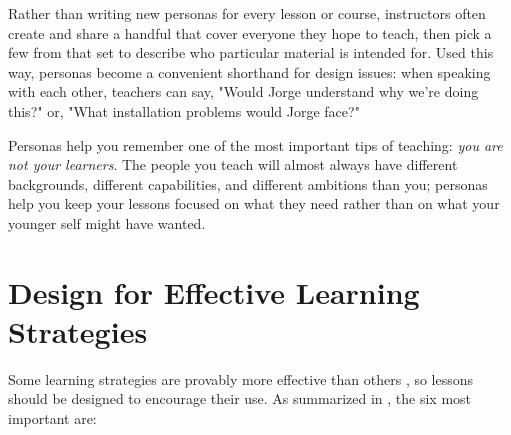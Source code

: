 \documentclass[10pt,letterpaper]{article}
\newcommand{\rulemajor}[1]{\section{#1}}
\begin{document}
Rather than writing new personas for every lesson or course, instructors often
create and share a handful that cover everyone they hope to teach, then pick a
few from that set to describe who particular material is intended for.  Used
this way, personas become a convenient shorthand for design issues: when
speaking with each other, teachers can say, "Would Jorge understand why we're
doing this?" or, "What installation problems would Jorge face?"

Personas help you remember one of the most important tips of teaching:
\emph{you are not your learners}.  The people you teach will almost always have
different backgrounds, different capabilities, and different ambitions than you;
personas help you keep your lessons focused on what they need rather than on
what your younger self might have wanted.

\rulemajor{Design for Effective Learning Strategies}

Some learning strategies are provably more effective than others
\cite{Rohr2015,Kang2016,Miya2018}, so lessons should be designed to encourage
their use.  As summarized in \cite{Wein2018a,Wein2018b}, the six most important
are:
\end{document}
